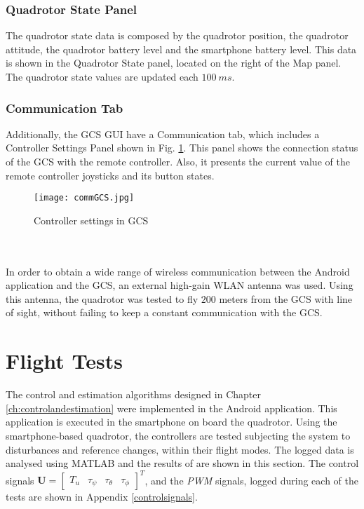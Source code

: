 \subsubsection*{Quadrotor State Panel}
The quadrotor state data is composed by the quadrotor position, the quadrotor attitude, the quadrotor battery level and the smartphone battery level. This data is shown in the Quadrotor State panel, located on the right of the Map panel. The quadrotor state values are updated each $100\ ms$.
\subsubsection*{Communication Tab}
Additionally, the GCS GUI have a Communication tab, which includes a Controller Settings Panel shown in Fig. \ref{fig:commGCS}. This panel shows the connection status of the GCS with the remote controller. Also, it presents the current value of the remote controller joysticks and its button states.
\begin{figure}[h]
\begin{center}
\texttt{[image: commGCS.jpg]}  
\caption{Controller settings in GCS} 
\label{fig:commGCS}
\end{center}
\end{figure}
\\\\
In order to obtain a wide range of wireless communication between the Android application and the GCS, an external high-gain WLAN antenna was used. Using this antenna, the quadrotor was tested to fly $200$ meters from the GCS with line of sight, without failing to keep a constant communication with the GCS.

\section{Flight Tests} \label{sec:tests}
The control and estimation algorithms designed in Chapter \ref{ch:controlandestimation} were implemented in the Android application. This application is executed in the smartphone on board the quadrotor. Using the smartphone-based quadrotor, the controllers are tested subjecting the system to disturbances and reference changes, within their flight modes. The logged data is analysed using MATLAB and the results of are shown in this section. The control signals $\mathbf{U} = \begin{bmatrix}
T_u & \tau_\psi & \tau_\theta & \tau_\phi
\end{bmatrix}^{T}$, and the \textit{PWM} signals, logged during each of the tests are shown in Appendix \ref{controlsignals}.

